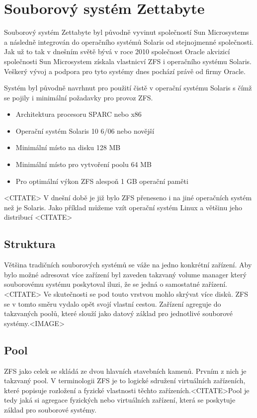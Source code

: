 \section{Souborový systém Zettabyte}
    Souborový systém Zettabyte byl původně vyvinut společností Sun Microsystems a následně integrován do operačního systémů Solaris od stejnojmenné společnosti.
    Jak už to tak v dnešním světě bývá v roce 2010 společnost Oracle akvizicí společnosti Sun Microsystem získala vlastnicví ZFS i operačního systému Solaris. Veškerý vývoj
    a podpora pro tyto systémy dnes pochází právě od firmy Oracle.
    
    Systém byl původně navrhnut pro použití čistě v operační systému Solaris s čímž se pojily i minimální požadavky pro provoz ZFS. 
    \begin{itemize}
      \item Architektura procesoru SPARC nebo x86 
      \item Operační systém Solaris 10 6/06 nebo novější
      \item Minimální místo na disku 128 MB 
      \item Minimální místo pro vytvoření poolu 64 MB 
      \item Pro optimální výkon ZFS alespoň 1 GB operační paměti
    \end{itemize}
    <CITATE>
    V dnešní době je již bylo ZFS přeneseno i na jiné operačních systém než je Solaris. Jako příklad můžeme vzít operační systém Linux a většinu jeho distribucí <CITATE> 
    
    \subsection{Struktura}
    Většina tradičních souborových systémů se váže na jedno konkrétní zařízení. Aby bylo možné adresovat více zařízení byl zaveden takzvaný volume manager který souborovému
    systému poskytoval iluzi, že se jedná o samostatné zařízení. <CITATE> Ve skutečnosti se pod touto vrstvou mohlo skrývat více disků. ZFS se v tomto směru vydalo opět svojí
    vlastní cestou. Zařízení agreguje do takzvaných poolů, které slouží jako datový základ pro jednotlivé souborové systémy.<IMAGE>
    \subsection{Pool}
    ZFS jako celek se skládá ze dvou hlavních stavebních kamenů. Prvním z nich je takzvaný pool. V terminologii ZFS je to logické sdružení virtuálních zařízeních, které popisuje rozložení a fyzické vlastnosti těchto zařízeních.<CITATE>Pool je tedy jaká si agregace fyzických nebo virtuálních zařízení, která se poskytuje základ pro souborové systémy.

